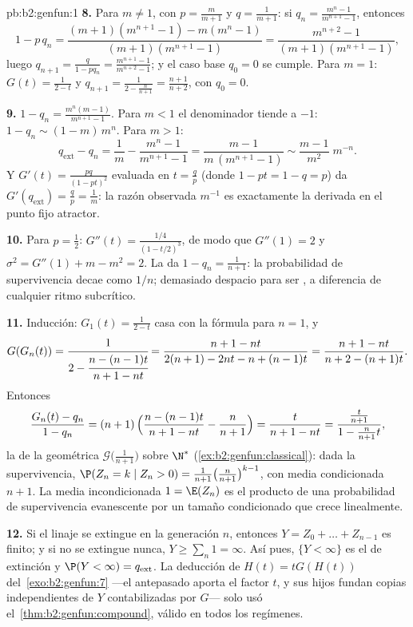 \begin{solution}{pb:b2:genfun:1}
\textbf{8.} Para $m \neq 1$, con $p = \frac m{m+1}$ y $q =
\frac1{m+1}$: si $q_n = \frac{m^n - 1}{m^{n+1} - 1}$, entonces
\[
1 - p\,q_n = \frac{(m+1)(m^{n+1} - 1) - m(m^n - 1)}
{(m+1)(m^{n+1} - 1)} = \frac{m^{n+2} - 1}{(m+1)(m^{n+1} -
1)},
\]
luego $q_{n+1} = \frac{q}{1 - pq_n} = \frac{m^{n+1} - 1}{m^{n+2} -
1}$; y el caso base $q_0 = 0$ se cumple. Para $m = 1$: $G(t) =
\frac1{2 - t}$ y $q_{n+1} = \frac1{2 - \frac{n}{n+1}} =
\frac{n+1}{n+2}$, con $q_0 = 0$.

\textbf{9.} $1 - q_n = \frac{m^n(m - 1)}{m^{n+1} - 1}$. Para $m < 1$
el denominador tiende a $-1$: $1 - q_n \sim (1 - m)\,m^n$. Para $m >
1$:
\[
q_{\mathrm{ext}} - q_n = \frac1m - \frac{m^n - 1}{m^{n+1} -
1} = \frac{m - 1}{m\,(m^{n+1} - 1)} \sim \frac{m -
1}{m^{2}}\;m^{-n} .
\]
Y $G'(t) = \frac{pq}{(1 - pt)^2}$ evaluada en $t = \frac qp$ (donde
$1 - pt = 1 - q = p$) da $G'(q_{\mathrm{ext}}) = \frac qp =
\frac1m$: la razón observada $m^{-1}$ es exactamente la derivada en
el punto fijo atractor.

\textbf{10.} Para $p = \frac12$: $G''(t) = \frac{1/4}{(1 - t/2)^3}$,
de modo que $G''(1) = 2$ y $\sigma^2 = G''(1) + m - m^2 = 2$. La
 da $1 - q_n = \frac1{n+1}$: la probabilidad de
supervivencia decae como $1/n$; demasiado despacio para ser
, a diferencia de cualquier ritmo subcrítico.

\textbf{11.} Inducción: $G_1(t) = \frac1{2-t}$ casa con la fórmula
para $n = 1$, y
\[
G(G_n(t)) = \cfrac{1}{2 - \cfrac{n - (n-1)t}{n+1 - nt}}
= \frac{n + 1 - nt}{2(n+1) - 2nt - n + (n-1)t}
= \frac{n+1 - nt}{n + 2 - (n+1)t} .
\]
Entonces
\[
\frac{G_n(t) - q_n}{1 - q_n}
= (n+1)\,\Bigl(\frac{n - (n-1)t}{n+1 - nt} -
\frac{n}{n+1}\Bigr)
= \frac{t}{n + 1 - nt}
= \frac{\frac{t}{n+1}}{1 - \frac{n}{n+1}t} ,
\]
la  de la  geométrica
$\mathcal G\bigl(\frac1{n+1} \bigr)$ sobre $\N^*$
(\cref{ex:b2:genfun:classical}): dada la supervivencia, $\P(Z_n = k
\mid Z_n > 0) = \frac1{n+1}\bigl(\frac n{n+1}\bigr)^{k-1}$, con media
condicionada $n + 1$. La media incondicionada $1 = \E(Z_n)$ es el
producto de una probabilidad de supervivencia evanescente por un
tamaño condicionado que crece linealmente.

\textbf{12.} Si el linaje se extingue en la generación $n$, entonces
$Y = Z_0 + \dots + Z_{n-1}$ es finito; y si no se extingue nunca, $Y
\geq \sum_n 1 = \infty$. Así pues, $\{Y < \infty\}$ es el  de
extinción y $\P(Y < \infty) = q_{\mathrm{ext}}$. La deducción de
$H(t) = tG(H(t))$ del~\cref{exo:b2:genfun:7} ---el antepasado aporta
el factor $t$, y sus hijos fundan copias independientes de $Y$
contabilizadas por $G$--- solo usó el~\cref{thm:b2:genfun:compound}, válido en todos los regímenes.


\end{solution}
